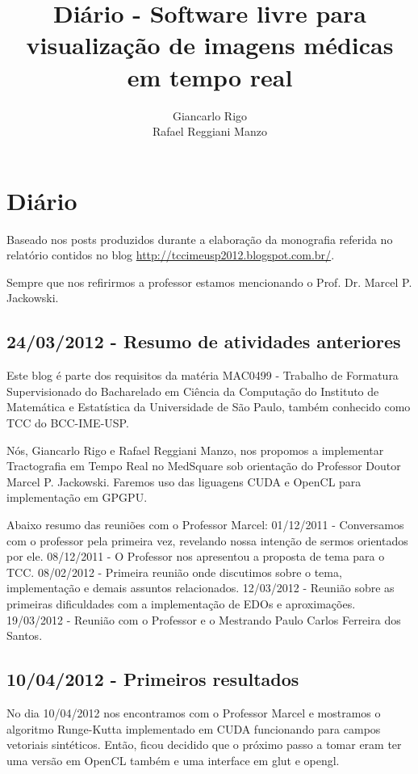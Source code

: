 \documentclass[a4paper,11pt]{report}
\title{Diário - Software livre para visualização de imagens médicas em tempo real}
\author{Giancarlo Rigo\\
        Rafael Reggiani Manzo}
\begin{document}
\maketitle
\tableofcontents

\chapter{Diário}

Baseado nos posts produzidos durante a elaboração da monografia referida no relatório contidos no blog \href{http://tccimeusp2012.blogspot.com.br/}{http://tccimeusp2012.blogspot.com.br/}.

Sempre que nos refirirmos a professor estamos mencionando o Prof. Dr. Marcel P. Jackowski.

\section{24/03/2012 - Resumo de atividades anteriores}
Este blog é parte dos requisitos da matéria MAC0499 - Trabalho de Formatura Supervisionado do Bacharelado em Ciência da Computação do Instituto de Matemática e Estatística da Universidade de São Paulo, também conhecido como TCC do BCC-IME-USP.

Nós, Giancarlo Rigo e Rafael Reggiani Manzo, nos propomos a implementar Tractografia em Tempo Real no MedSquare sob orientação do Professor Doutor Marcel P. Jackowski. Faremos uso das liguagens CUDA e OpenCL para implementação em GPGPU.

Abaixo resumo das reuniões com o Professor Marcel:
01/12/2011 - Conversamos com o professor pela primeira vez, revelando nossa intenção de sermos orientados por ele.
08/12/2011 - O Professor nos apresentou a proposta de tema para o TCC.
08/02/2012 - Primeira reunião onde discutimos sobre o tema, implementação e demais assuntos relacionados.
12/03/2012 - Reunião sobre as primeiras dificuldades com a implementação de EDOs e aproximações.
19/03/2012 - Reunião com o Professor e o Mestrando Paulo Carlos Ferreira dos Santos.

\section{10/04/2012 - Primeiros resultados}
No dia 10/04/2012 nos encontramos com o Professor Marcel e mostramos o algoritmo Runge-Kutta implementado em CUDA funcionando para campos vetoriais sintéticos. Então, ficou decidido que o próximo passo a tomar eram ter uma versão em OpenCL também e uma interface em glut e opengl.
\end{document}
